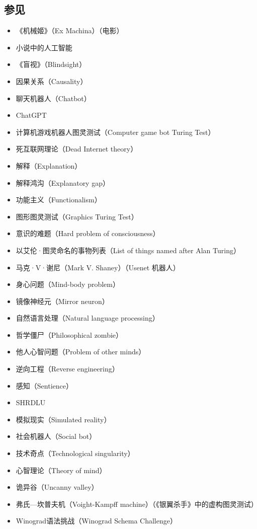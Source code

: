 \subsection{参见}
\begin{itemize}
\item 《机械姬》（Ex Machina）（电影）
\item 小说中的人工智能
\item 《盲视》（Blindsight）
\item 因果关系（Causality）
\item 聊天机器人（Chatbot）
\item ChatGPT
\item 计算机游戏机器人图灵测试（Computer game bot Turing Test）
\item 死互联网理论（Dead Internet theory）
\item 解释（Explanation）
\item 解释鸿沟（Explanatory gap）
\item 功能主义（Functionalism）
\item 图形图灵测试（Graphics Turing Test）
\item 意识的难题（Hard problem of consciousness）
\item 以艾伦·图灵命名的事物列表（List of things named after Alan Turing）
\item 马克·V·谢尼（Mark V. Shaney）（Usenet 机器人）
\item 身心问题（Mind-body problem）
\item 镜像神经元（Mirror neuron）
\item 自然语言处理（Natural language processing）
\item 哲学僵尸（Philosophical zombie）
\item 他人心智问题（Problem of other minds）
\item 逆向工程（Reverse engineering）
\item 感知（Sentience）
\item SHRDLU
\item 模拟现实（Simulated reality）
\item 社会机器人（Social bot）
\item 技术奇点（Technological singularity）
\item 心智理论（Theory of mind）
\item 诡异谷（Uncanny valley）
\item 弗氏—坎普夫机（Voight-Kampff machine）（《银翼杀手》中的虚构图灵测试）
\item Winograd语法挑战（Winograd Schema Challenge）
\end{itemize}
